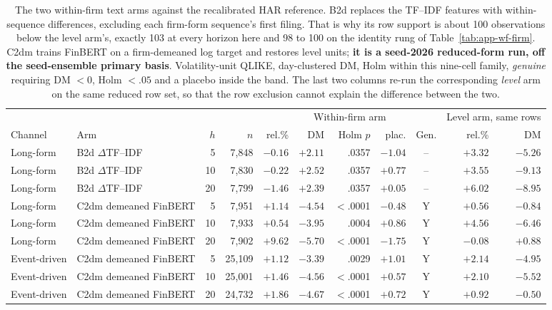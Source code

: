 \begin{table}[htbp]
\centering
\caption[Within-firm text arms against the recalibrated HAR]{The two
within-firm text arms against the recalibrated HAR reference. B2d replaces
the TF--IDF features with within-sequence differences, excluding each
firm-form sequence's first filing. That is why its row support is about
100 observations below the level arm's, exactly 103 at every horizon here and
98 to 100 on the identity rung of Table~\ref{tab:app-wf-firm}. C2dm trains FinBERT on a
firm-demeaned log target and restores level units;
\textbf{it is a seed-2026 reduced-form run, off the seed-ensemble primary
basis}. Volatility-unit QLIKE, day-clustered DM, Holm within this
nine-cell family, \emph{genuine} requiring DM $<0$, Holm $<.05$ and a
placebo inside the band. The last two columns re-run the corresponding
\emph{level} arm on the same reduced row set, so that the row exclusion
cannot explain the difference between the two.}
\label{tab:app-wf-har}
\singlespacing\footnotesize
\setlength{\tabcolsep}{2pt}
\begin{tabular}{@{}llrrrrrrcrr@{}}
\toprule
& & & & \multicolumn{5}{c}{Within-firm arm} & \multicolumn{2}{c}{Level arm, same rows} \\
\cmidrule(lr){5-9}\cmidrule(lr){10-11}
Channel & Arm & $h$ & $n$ & rel.\% & DM & Holm $p$ & plac. & Gen. & rel.\% & DM \\
\midrule
Long-form & B2d $\Delta$TF--IDF & 5 & 7{,}848 & $-0.16$ & $+2.11$ & .0357 & $-1.04$ & -- & $+3.32$ & $-5.26$ \\
Long-form & B2d $\Delta$TF--IDF & 10 & 7{,}830 & $-0.22$ & $+2.52$ & .0357 & $+0.77$ & -- & $+3.55$ & $-9.13$ \\
Long-form & B2d $\Delta$TF--IDF & 20 & 7{,}799 & $-1.46$ & $+2.39$ & .0357 & $+0.05$ & -- & $+6.02$ & $-8.95$ \\
\addlinespace
Long-form & C2dm demeaned FinBERT & 5 & 7{,}951 & $+1.14$ & $-4.54$ & $<$.0001 & $-0.48$ & Y & $+0.56$ & $-0.84$ \\
Long-form & C2dm demeaned FinBERT & 10 & 7{,}933 & $+0.54$ & $-3.95$ & .0004 & $+0.86$ & Y & $+4.56$ & $-6.46$ \\
Long-form & C2dm demeaned FinBERT & 20 & 7{,}902 & $+9.62$ & $-5.70$ & $<$.0001 & $-1.75$ & Y & $-0.08$ & $+0.88$ \\
\addlinespace
Event-driven & C2dm demeaned FinBERT & 5 & 25{,}109 & $+1.12$ & $-3.39$ & .0029 & $+1.01$ & Y & $+2.14$ & $-4.95$ \\
Event-driven & C2dm demeaned FinBERT & 10 & 25{,}001 & $+1.46$ & $-4.56$ & $<$.0001 & $+0.57$ & Y & $+2.10$ & $-5.52$ \\
Event-driven & C2dm demeaned FinBERT & 20 & 24{,}732 & $+1.86$ & $-4.67$ & $<$.0001 & $+0.72$ & Y & $+0.92$ & $-0.50$ \\
\bottomrule
\end{tabular}
\end{table}


